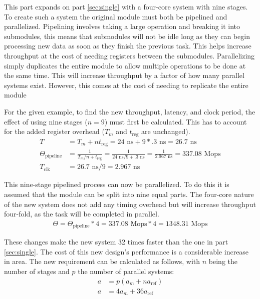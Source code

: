 \documentclass[11pt]{article}
\begin{document}
This part expands on part \ref{sec:single} with a four-core system with nine stages.
To create such a system the original module must both be pipelined and parallelized.
Pipelining involves taking a large operation and breaking it into submodules,
this means that submodules will not be idle long as they can begin processing new data as soon as they finish the previous task.
This helps increase throughput at the cost of needing registers between the submodules.
Parallelizing simply duplicates the entire module to allow multiple operations to be done at the same time.
This will increase throughput by a factor of how many parallel systems exist.
However, this comes at the cost of needing to replicate the entire module

For the given example, to find the new throughput, latency, and clock period,
the effect of using nine stages ($n = 9$) must first be calculated.
This has to account for the added register overhead\cite{dally} ($T_m$ and $t_{\text{reg}}$ are unchanged).
\begin{align}
    T &= T_m + nt_{\text{reg}} = 24\text{ ns} + 9*.3\text{ ns} = 26.7\text{ ns}\\
    \Theta_{\text{pipeline}} &= \frac{1}{T_m/n+t_{\text{reg}}} = \frac{1}{24\text{ ns}/9+.3\text{ ns}} = \frac{1}{2.967\text{ ns}} = 337.08\text{ Mops}\\
    T_{\text{clk}} &=  26.7\text{ ns} / 9 = 2.967\text{ ns}
\end{align}

This nine-stage pipelined process can now be parallelized.
To do this it is assumed that the module can be split into nine equal parts. 
The four-core nature of the new system does not add any timing overhead but will increase throughput four-fold, as the task will be completed in parallel.
\begin{align}
    \Theta = \Theta_{\text{pipeline}} * 4 = 337.08\text{ Mops} * 4 = 1348.31 \text{ Mops}
\end{align}

These changes make the new system 32 times faster than the one in part \ref{sec:single}.
The cost of this new design's performance is a considerable increase in area.
The new requirement can be calculated as follows, with $n$ being the number of stages and $p$ the number of parallel systems:
\begin{align}
    a &= p(a_m + na_{\text{ref}}) \\ 
    a &= 4a_m + 36a_{\text{ref}}
\end{align}
\end{document}

